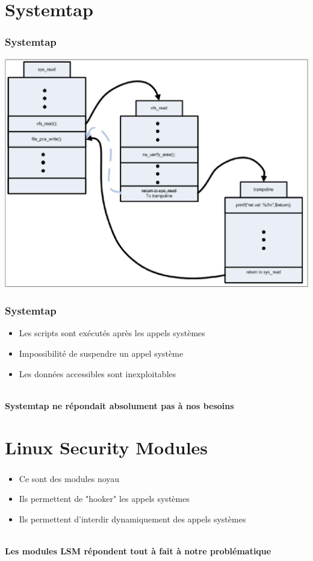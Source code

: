 \documentclass{beamer}
\begin{document}
\section{Systemtap}
\begin{frame}
\frametitle{Systemtap}
\begin{center}
	\includegraphics[scale=0.25]{kretprob.png}
\end{center}
\end{frame}

\begin{frame}
\frametitle{Systemtap}
\begin{itemize}
	\item Les scripts sont exécutés après les appels systèmes
	\item Impossibilité de suspendre un appel système
	\item Les données accessibles sont inexploitables
\end{itemize}
~\\
\textbf{Systemtap ne répondait absolument pas à nos besoins}

\end{frame}

\section{Linux Security Modules}
\begin{frame}
\frametitle{}
	\begin{itemize}
		\item Ce sont des modules noyau
		\item Ils permettent de "hooker" les appels systèmes
		\item Ils permettent d'interdir dynamiquement des appels systèmes
	\end{itemize}
~\\	
\textbf{Les modules LSM répondent tout à fait à notre problématique}
\end{frame}
\end{document}
